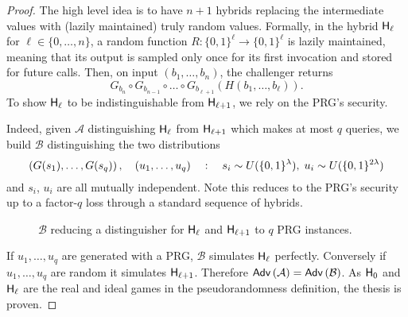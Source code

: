 \begin{proof}
	The high level idea is to have $n+1$ hybrids replacing the intermediate values with (lazily maintained) truly random values.
	Formally, in the hybrid $\mathsf{H}_\ell$ for $\ell \in \{0, \ldots, n\}$, a random function $R: \{0,1\}^\ell \to \{0,1\}^\ell$ is lazily maintained, meaning that its output is sampled only once for its first invocation and stored for future calls.
	Then, on input $(b_1, \ldots, b_n)$, the challenger returns
	\[
		G_{b_n} \circ G_{b_{n-1}} \circ \ldots \circ G_{b_{\ell + 1}} ( H(b_1, \ldots, b_\ell) ).
	\]
	To show $\mathsf{H}_\ell$ to be indistinguishable from $\mathsf{H}_{\ell + 1}$, we rely on the PRG's security.
	
	Indeed, given $\mathcal{A}$ distinguishing $\mathsf{H}_\ell$ from $\mathsf{H}_{\ell + 1}$ which makes at most $q$ queries, we build $\mathcal{B}$ distinguishing the two distributions
	\[
		\left(G(s_1), \ldots, G(s_q)\right),
			\quad
		\left(u_1, \ldots, u_q\right)
			\quad : \quad
		s_i \sim U(\{0,1\}^\lambda)
			, \;
		u_i \sim U(\{0,1\}^{2\lambda})
	\]
	and $s_i$, $u_i$ are all mutually independent.
	Note this reduces to the PRG's security up to a factor-$q$ loss through a standard sequence of hybrids.
	\begin{figure}[htb]
	\centering
	\label{prot:GGM84:prg_loose_reduction}
	\caption{$\mathcal{B}$ reducing a distinguisher for $\mathsf{H}_{\ell}$ and $\mathsf{H}_{\ell + 1}$ to $q$ PRG instances.}
	\end{figure}
	
	If $u_1, \ldots, u_q$ are generated with a PRG, $\mathcal{B}$ simulates $\mathsf{H}_\ell$ perfectly. Conversely if $u_1, \ldots, u_q$ are random it simulates $\mathsf{H}_{\ell + 1}$.
	Therefore $\mathsf{Adv}\left(\mathcal{A}\right) = \mathsf{Adv}\left(\mathcal{B}\right)$.
	As $\mathsf{H}_0$ and $\mathsf{H}_\ell$ are the real and ideal games in the pseudorandomness definition, the thesis is proven.
\end{proof}
